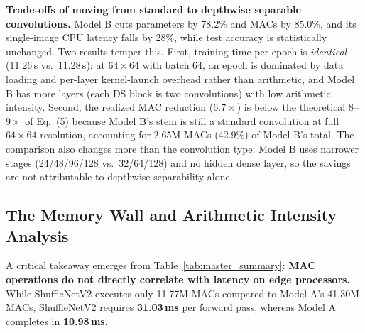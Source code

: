 \documentclass[11pt,a4paper]{article}
\begin{document}
\begin{table}[H]
  \centering
  \caption{Master hardware profiling and test set evaluation summary across all architectures.}
  \label{tab:master_summary}
\end{table}

\textbf{Trade-offs of moving from standard to depthwise separable convolutions.} Model B cuts parameters by 78.2\% and MACs by 85.0\%, and its single-image CPU latency falls by 28\%, while test accuracy is statistically unchanged. Two results temper this. First, training time per epoch is \emph{identical} (11.26\,s vs.\ 11.28\,s): at $64 \times 64$ with batch 64, an epoch is dominated by data loading and per-layer kernel-launch overhead rather than arithmetic, and Model B has more layers (each DS block is two convolutions) with low arithmetic intensity. Second, the realized MAC reduction ($6.7\times$) is below the theoretical $8$--$9\times$ of Eq.~(5) because Model B's stem is still a standard convolution at full $64 \times 64$ resolution, accounting for 2.65M MACs (42.9\%) of Model B's total. The comparison also changes more than the convolution type: Model B uses narrower stages (24/48/96/128 vs.\ 32/64/128) and no hidden dense layer, so the savings are not attributable to depthwise separability alone.

\subsection{The Memory Wall and Arithmetic Intensity Analysis}
A critical takeaway emerges from Table~\ref{tab:master_summary}: \textbf{MAC operations do not directly correlate with latency on edge processors.}
While ShuffleNetV2 executes only 11.77M MACs compared to Model A's 41.30M MACs, ShuffleNetV2 requires \textbf{31.03\,ms} per forward pass, whereas Model A completes in \textbf{10.98\,ms}.
\end{document}
